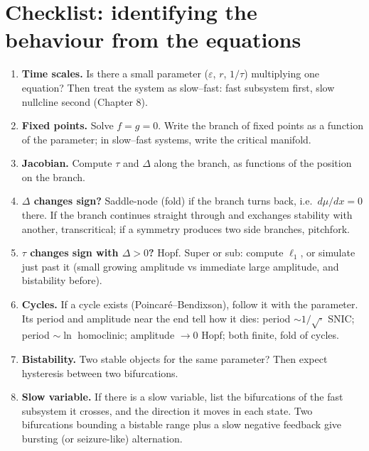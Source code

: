 \documentclass[11pt,openany]{report}
\newcommand{\eps}{\varepsilon}
\begin{document}
\chapter{Checklist: identifying the behaviour from the equations}
\begin{recipe}
\begin{enumerate}
\item \textbf{Time scales.} Is there a small parameter ($\eps$, $r$, $1/\tau$) multiplying one equation? Then treat the
system as slow--fast: fast subsystem first, slow nullcline second (Chapter 8).
\item \textbf{Fixed points.} Solve $f = g = 0$. Write the branch of fixed points as a function of the parameter; in
slow--fast systems, write the critical manifold.
\item \textbf{Jacobian.} Compute $\tau$ and $\Delta$ along the branch, as functions of the position on the branch.
\item \textbf{$\Delta$ changes sign?} Saddle-node (fold) if the branch turns back, i.e.\ $d\mu/dx = 0$ there. If the branch
continues straight through and exchanges stability with another, transcritical; if a symmetry produces two side
branches, pitchfork.
\item \textbf{$\tau$ changes sign with $\Delta>0$?} Hopf. Super or sub: compute $\ell_1$, or simulate just past it
(small growing amplitude vs immediate large amplitude, and bistability before).
\item \textbf{Cycles.} If a cycle exists (Poincaré--Bendixson), follow it with the parameter. Its period and amplitude
near the end tell how it dies: period $\sim1/\sqrt{\cdot}$ SNIC; period $\sim\ln$ homoclinic; amplitude $\to0$ Hopf;
both finite, fold of cycles.
\item \textbf{Bistability.} Two stable objects for the same parameter? Then expect hysteresis between two bifurcations.
\item \textbf{Slow variable.} If there is a slow variable, list the bifurcations of the fast subsystem it crosses, and
the direction it moves in each state. Two bifurcations bounding a bistable range plus a slow negative feedback give
bursting (or seizure-like) alternation.
\end{enumerate}
\end{recipe}
\end{document}
